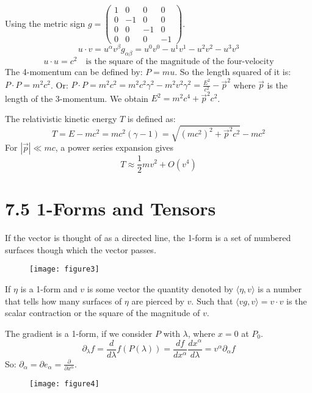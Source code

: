 \documentclass{article}
\begin{document}
    Using the metric sign $ g = \begin{pmatrix} 1 & 0 & 0 & 0 \\ 0 & -1 & 0 & 0 \\ 0 & 0 & -1 & 0 \\ 0 & 0 & 0 & -1 \end{pmatrix} $.
    $$ u \cdot v = u^\alpha v^\beta g_{\alpha\beta} = u^0 v^0 - u^1 v^1 - u^2 v^2 - u^3 v^3 $$
    $$ u \cdot u = c^2 \quad \text{is the square of the magnitude of the four-velocity} $$
    The 4-momentum can be defined by: $P = m u$.
    So the length squared of it is: $P \cdot P = m^2 c^2$.
    Or: $P \cdot P = m^2 c^2 = m^2 c^2 \gamma^2 - m^2 v^2 \gamma^2 = \frac{E^2}{c^2} - \vec{p}^2$ where $\vec{p}$ is the length of the 3-momentum.
    We obtain $E^2 = m^2 c^4 + \vec{p}^2 c^2$.
    
    The relativistic kinetic energy $T$ is defined as:
    $$ T = E - mc^2 = mc^2(\gamma - 1) = \sqrt{(m c^2)^2 + \vec{p}^2 c^2} - m c^2 $$
    For $|\vec{p}| \ll m c$, a power series expansion gives
    $$ T \approx \frac{1}{2} m v^2 + O(v^4) $$
    
    \section*{7.5 1-Forms and Tensors}
    If the vector is thought of as a directed line, the 1-form is a set of numbered surfaces though which the vector passes.
    
    \begin{figure}[h]
    	\centering
    	\texttt{[image: figure3]}
    	\caption{}
    	\label{fig:figure3}
    \end{figure}
    
    If $\eta$ is a 1-form and $v$ is some vector the quantity denoted by $\langle \eta, v \rangle$ is a number that tells how many surfaces of $\eta$ are pierced by $v$.
    Such that $\langle v g, v \rangle = v \cdot v$ is the scalar contraction or the square of the magnitude of $v$.
    
    The gradient is a 1-form, if we consider $P$ with $\lambda$, where $x=0$ at $P_0$.
    $$ \partial_\lambda f = \frac{d}{d\lambda} f(P(\lambda)) = \frac{df}{dx^\alpha} \frac{dx^\alpha}{d\lambda} = v^\alpha \partial_\alpha f $$
    So: $\partial_\alpha = \partial e_\alpha = \frac{\partial}{\partial x^\alpha}$.
    
    \begin{figure}[h]
    	\centering
    	\texttt{[image: figure4]}
    	\caption{}
    	\label{fig:figure4}
    \end{figure}
    
\end{document}
